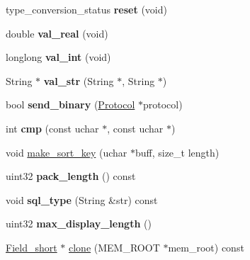 \begin{DoxyCompactItemize}
\item 
\mbox{\label{classField__short_a1023e7356376235a5046c984e62a229b}} 
type\+\_\+conversion\+\_\+status {\bfseries reset} (void)
\item 
\mbox{\label{classField__short_a5c2fe9927558d0f4000c92137ed4323f}} 
double {\bfseries val\+\_\+real} (void)
\item 
\mbox{\label{classField__short_a7e9759fcf9c7b8a9e6a38242ba8a2870}} 
longlong {\bfseries val\+\_\+int} (void)
\item 
\mbox{\label{classField__short_a8e7d2cf56919dc8a346f6a1bc7e59160}} 
String $\ast$ {\bfseries val\+\_\+str} (String $\ast$, String $\ast$)
\item 
\mbox{\label{classField__short_ab6f9e2a43a335eecdbaaa8a3529b4d29}} 
bool {\bfseries send\+\_\+binary} (\mbox{\hyperlink{classProtocol}{Protocol}} $\ast$protocol)
\item 
\mbox{\label{classField__short_a113b54259c9611dbf08d925f32f7528a}} 
int {\bfseries cmp} (const uchar $\ast$, const uchar $\ast$)
\item 
void \mbox{\hyperlink{classField__short_a44284294029bf3384a67bead9878c167}{make\+\_\+sort\+\_\+key}} (uchar $\ast$buff, size\+\_\+t length)
\item 
\mbox{\label{classField__short_a7c2ff3c4122a4cf4ce869be6b4b7574e}} 
uint32 {\bfseries pack\+\_\+length} () const
\item 
\mbox{\label{classField__short_ac9c6c92c0f44d5cde60e3364a76a95e1}} 
void {\bfseries sql\+\_\+type} (String \&str) const
\item 
\mbox{\label{classField__short_a00b61ffb554b2804cebcdfe3cd1cce52}} 
uint32 {\bfseries max\+\_\+display\+\_\+length} ()
\item 
\mbox{\hyperlink{classField__short}{Field\+\_\+short}} $\ast$ \mbox{\hyperlink{classField__short_af95c6951f580be2b648c051ae9a70a3e}{clone}} (M\+E\+M\+\_\+\+R\+O\+OT $\ast$mem\+\_\+root) const
\item 

\end{DoxyCompactItemize}
